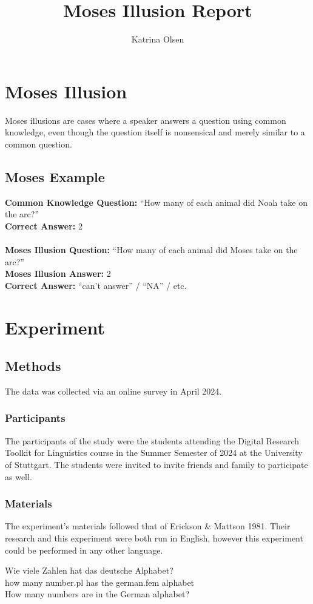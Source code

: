 \documentclass[12pt,a4paper]{article}
\author{Katrina Olsen}
\title{Moses Illusion Report}
\begin{document}
\maketitle

\tableofcontents

\section{Moses Illusion}
Moses illusions are cases where a speaker answers a question using common knowledge, even though the question itself is nonsensical and merely similar to a common question.
\subsection{Moses Example} \label{mosex}
\textbf{Common Knowledge Question:} \enquote{How many of each animal did Noah take on the arc?}\\
\textbf{Correct Answer:} 2\\
\\
\textbf{Moses Illusion Question:} \enquote{How many of each animal did Moses take on the arc?}\\
\textbf{Moses Illusion Answer:} 2\\
\textbf{Correct Answer:} \enquote{can't answer} / \enquote{NA} / etc.
\section{Experiment}
\subsection{Methods}
The data was collected via an online survey in April 2024.
\subsubsection{Participants}
The participants of the study were the students attending the Digital Research Toolkit for Linguistics course in the Summer Semester of 2024 at the University of Stuttgart. The students were invited to invite friends and family to participate as well.

\subsubsection{Materials}
The experiment's materials followed that of Erickson \& Mattson 1981. Their research and this experiment were both run in English, however this experiment could be performed in any other language.
\begin{exe}
\ex
\gll Wie viele Zahlen hat das deutsche Alphabet?\\
how many number.pl has the german.fem alphabet\\
\glt How many numbers are in the German alphabet?
\end{exe}
\end{document}
